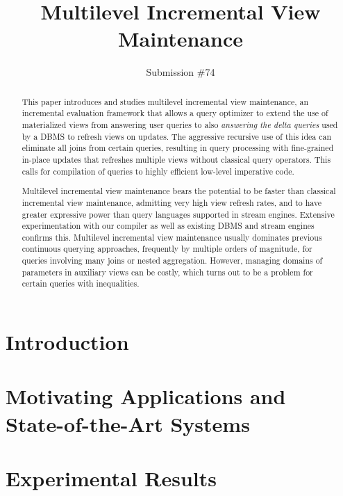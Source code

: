 \documentclass{sig-alternate}
\title{Multilevel Incremental View Maintenance}
\author{
Submission \#74
}
\begin{document}
\maketitle


\begin{abstract}
This paper introduces and studies multilevel incremental view maintenance,
an incremental
evaluation framework that allows a query optimizer to extend the use of
materialized views from answering user queries to also \textit{answering the delta
queries} used by a DBMS to refresh views on updates.
The aggressive recursive use of this idea can eliminate all joins from certain
queries, resulting in query processing with fine-grained in-place updates that
refreshes multiple views without classical query operators. This calls for
compilation of queries to highly efficient low-level imperative code.

Multilevel incremental view maintenance bears the potential to be
faster than classical incremental view maintenance, admitting very high view refresh rates,
and to have greater expressive power than query
languages supported in stream engines.
%
Extensive experimentation with
our compiler as well as existing DBMS and stream engines confirms this.
Multilevel incremental view maintenance usually dominates
previous continuous querying approaches, frequently by multiple orders of
magnitude, for queries involving many joins or nested aggregation. However,
managing domains of parameters in auxiliary views can be costly, which turns out
to be a problem for certain queries with inequalities.
\end{abstract}


\section{Introduction}
\label{sec:introduction}


\section{Motivating Applications and\\State-of-the-Art Systems}
\label{sec:sota}
%
%






\section{Experimental Results}
\label{sec:experiments}

\end{document}
